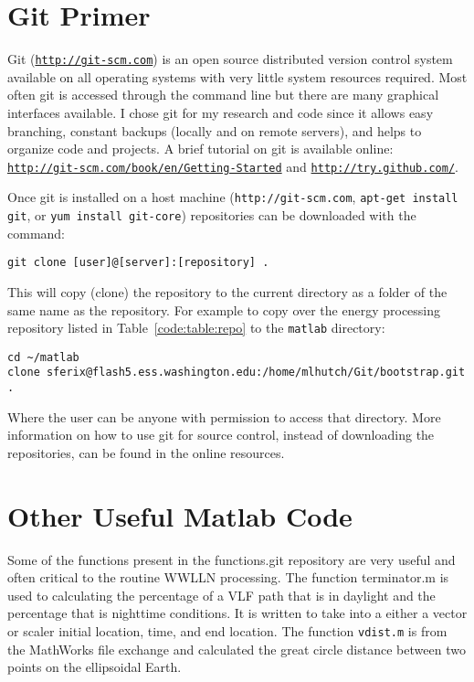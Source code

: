 \section{Git Primer}
\label{code:section:primer}

Git (\href{http://git-scm.com}{\texttt{http://git-scm.com}}) is an open source distributed version control system available on all operating systems with very little system resources required.
Most often git is accessed through the command line but there are many graphical interfaces available.
I chose git for my research and code since it allows easy branching, constant backups (locally and on remote servers), and helps to organize code and projects.
A brief tutorial on git is available online: \href{http://git-scm.com/book/en/Getting-Started}{\texttt{http://git-scm.com/book/en/Getting-Started}} and \href{http://try.github.com/}{\texttt{http://try.github.com/}}.

Once git is installed on a host machine (\texttt{http://git-scm.com}, \texttt{apt-get install git}, or \texttt{yum install git-core}) repositories can be downloaded with the command:

\begin{verbatim}
git clone [user]@[server]:[repository] .
\end{verbatim}

This will copy (clone) the repository to the current directory as a folder of the same name as the repository. 
For example to copy over the energy processing repository listed in Table~\ref{code:table:repo} to the \texttt{matlab} directory:

\begin{verbatim}
cd ~/matlab
clone sferix@flash5.ess.washington.edu:/home/mlhutch/Git/bootstrap.git .
\end{verbatim}

Where the user can be anyone with permission to access that directory.
More information on how to use git for source control, instead of downloading the repositories, can be found in the online resources.

\section{Other Useful Matlab Code}

Some of the functions present in the functions.git repository are very useful and often critical to the routine WWLLN processing.
The function terminator.m is used to calculating the percentage of a VLF path that is in daylight and the percentage that is nighttime conditions.
It is written to take into a either a vector or scaler initial location, time, and end location.
The function \texttt{vdist.m} is from the MathWorks file exchange and calculated the great circle distance between two points on the ellipsoidal Earth.

